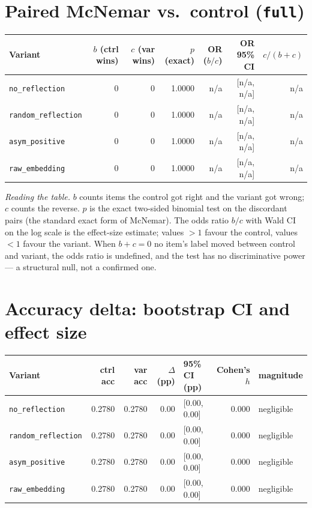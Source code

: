 \documentclass[11pt]{article}
\begin{document}
\section{Paired McNemar vs.\ control (\texttt{full})}
\begin{tabular}{l r r r r r r}
\toprule
Variant & $b$ (ctrl wins) & $c$ (var wins) & $p$ (exact) & OR ($b/c$) & OR 95\% CI & $c/(b+c)$ \\
\midrule
\texttt{no\_reflection} & 0 & 0 & 1.0000 & n/a & [n/a, n/a] & n/a \\
\texttt{random\_reflection} & 0 & 0 & 1.0000 & n/a & [n/a, n/a] & n/a \\
\texttt{asym\_positive} & 0 & 0 & 1.0000 & n/a & [n/a, n/a] & n/a \\
\texttt{raw\_embedding} & 0 & 0 & 1.0000 & n/a & [n/a, n/a] & n/a \\
\bottomrule
\end{tabular}

\noindent\textit{Reading the table.} $b$ counts items the control got right and the variant got wrong; $c$ counts the reverse. $p$ is the exact two-sided binomial test on the discordant pairs (the standard exact form of McNemar). The odds ratio $b/c$ with Wald CI on the log scale is the effect-size estimate; values $> 1$ favour the control, values $< 1$ favour the variant. When $b + c = 0$ no item's label moved between control and variant, the odds ratio is undefined, and the test has no discriminative power --- a structural null, not a confirmed one.

\section{Accuracy delta: bootstrap CI and effect size}
\begin{tabular}{l r r r l r l}
\toprule
Variant & ctrl acc & var acc & $\Delta$ (pp) & 95\% CI (pp) & Cohen's $h$ & magnitude \\
\midrule
\texttt{no\_reflection} & 0.2780 & 0.2780 & 0.00 & [0.00, 0.00] & 0.000 & negligible \\
\texttt{random\_reflection} & 0.2780 & 0.2780 & 0.00 & [0.00, 0.00] & 0.000 & negligible \\
\texttt{asym\_positive} & 0.2780 & 0.2780 & 0.00 & [0.00, 0.00] & 0.000 & negligible \\
\texttt{raw\_embedding} & 0.2780 & 0.2780 & 0.00 & [0.00, 0.00] & 0.000 & negligible \\
\bottomrule
\end{tabular}
\end{document}

